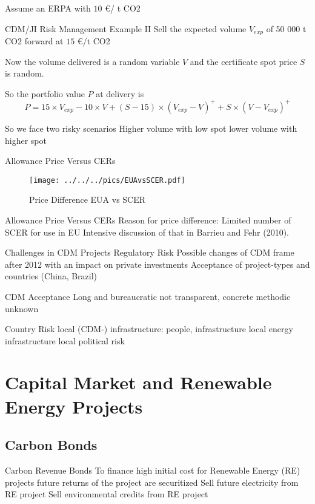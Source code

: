 	Assume an ERPA with $10$ \euro/ t CO2


CDM/JI Risk Management Example II
	Sell the expected volume $V_{exp}$ of 50 000 t CO2 forward at $15$ \euro /t CO2
	
	Now the volume delivered is a random variable $V$ and the certificate spot price $S$ is random.
	
	So the portfolio value $P$ at delivery is
		\begin{equation}\nonumber
		P = 15 \times V_{exp} - 10 \times V + (S-15) \times (V_{exp}-V)^+ + S \times (V-V_{exp})^+
		\end{equation}
 
	So we face two risky scenarios
		Higher volume with low spot
		lower volume with higher spot


Allowance Price Versus CERs
	\begin{figure}[h!]
	\centering
	\texttt{[image: ../../../pics/EUAvsSCER.pdf]}
	\caption{Price Difference EUA vs SCER}
	\label{fig:EUAvsSCER}
	\end{figure}


Allowance Price Versus CERs
	Reason for price difference: Limited number of SCER for use in EU
	Intensive discussion of that in Barrieu and Fehr (2010).	



Challenges in CDM Projects
	Regulatory  Risk
		Possible changes of CDM frame after 2012 with an impact on private investments
		Acceptance of project-types and countries (China, Brazil)

	CDM Acceptance
		Long and bureaucratic
		not transparent, concrete methodic unknown

	Country Risk
		local (CDM-) infrastructure: people, infrastructure
		local energy infrastructure
		local political risk


\section{Capital Market and Renewable Energy Projects}
\subsection{Carbon Bonds}

Carbon Revenue Bonds
	To finance high initial cost for Renewable Energy (RE) projects future returns of the project are securitized
		Sell future electricity from RE project
		Sell environmental credits from RE project

